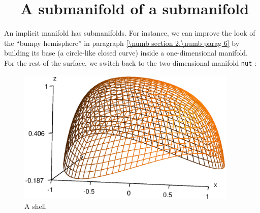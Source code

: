 \section{~~A submanifold of a submanifold}\label{\numb section 2.\numb parag 12}

An implicit manifold has submanifolds.
For instance, we can improve the look of the ``bumpy hemisphere'' in paragraph
\ref{\numb section 2.\numb parag 6} by building its base (a circle-like closed curve)
inside a one-dimensional manifold.
For the rest of the surface, we switch back to the two-dimensional manifold {\small\tt nut} :
\medskip

\begin{figure}[ht] \centering
  \includegraphics[width=105mm]{bumpy}
  \caption{A shell}
  \label{\numb section 2.\numb fig 15}
\end{figure}

